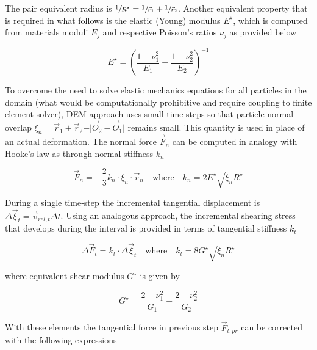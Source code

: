 The pair equivalent radius is $\sfrac{1}{R^{\star}}=\sfrac{1}{\vec{r}_{1}}+\sfrac{1}{\vec{r}_{2}}$. Another equivalent property that is required in what follows is the elastic (Young) modulus $E^{\star}$, which is computed from materials moduli $E_{j}$ and respective Poisson's ratios $\nu_{j}$ as provided below

\begin{equation}
E^{\star} = \left(\dfrac{1 - \nu_{1}^2}{E_{1}}+\dfrac{1 - \nu_{2}^2}{E_{2}}\right)^{-1}
\end{equation}

To overcome the need to solve elastic mechanics equations for all particles in the domain (what would be computationally prohibitive and require coupling to finite element solver), DEM approach uses small time-steps so that particle normal overlap $\xi_{n}=\vec{r}_{1}+\vec{r}_{2}-\vert\vec{O}_{2}-\vec{O}_{1}\vert$ remains small. This quantity is used in place of an actual deformation. The normal force $\vec{F}_{n}$ can be computed in analogy with Hooke's law as through normal stiffness $k_{n}$

\begin{equation}
\vec{F}_{n} = -\dfrac{2}{3}k_{n}\cdotp\xi_{n}\cdotp\vec{r}_{n}
\quad\text{where}\quad{}k_{n}=2{E}^{\star}\sqrt{\xi_{n}R^{\star}}
\end{equation}

During a single time-step the incremental tangential displacement is $\Delta\vec{\xi}_{t}=\vec{v}_{rel,t}\Delta{}t$. Using an analogous approach, the incremental shearing stress that develops during the interval is provided in terms of tangential stiffness $k_{t}$

\begin{equation}
\Delta\vec{F}_{t}=k_{t}\cdotp\Delta\vec{\xi}_{t}
\quad\text{where}\quad{}k_{t}=8{G}^{\star}\sqrt{{\xi}_{n}{R}^{\star}}
\end{equation}

\noindent{}where equivalent shear modulus $G^{\star}$ is given by

\begin{equation}
G^{\star} = \dfrac{2 - \nu_{1}^2}{G_{1}}+\dfrac{2 - \nu_{2}^2}{G_{2}}
\end{equation}

With these elements the tangential force in previous step $\vec{F}_{t,pr}$ can be corrected with the following expressions

